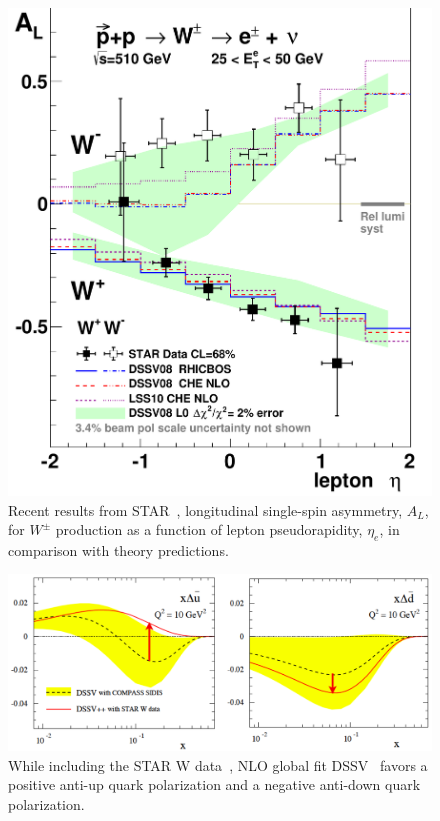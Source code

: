\begin{figure} [htbp]
  \centering
    \includegraphics[width=0.60\linewidth]{figs_xj/STAR-WAL_2012.pdf}
  \caption{\label{fig:STAR_W} Recent results from STAR~\cite{Adamczyk:2014xyw},  longitudinal single-spin asymmetry, $A_L$, for $W^\pm$ production as a function of lepton pseudorapidity, $\eta_e$, in comparison with theory predictions. 
 }
\end{figure}

\begin{figure} [htbp]
  \centering
    \includegraphics[width=0.98\linewidth]{figs_xj/DSSV_STARW_shift_sea_MS2013.pdf}
  \caption{\label{fig:STAR_WDSSV} While including the STAR W data~\cite{Adamczyk:2014xyw},  NLO global fit DSSV~\cite{DSSV2008} favors a positive anti-up quark polarization and a negative anti-down quark polarization. 
 }
\end{figure}



